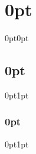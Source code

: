 












\titlespacing\section{0pt}{0pt}{0pt}
\titlespacing\subsection{0pt}{0pt}{1pt}
\titlespacing\subsubsection{0pt}{0pt}{1pt}
